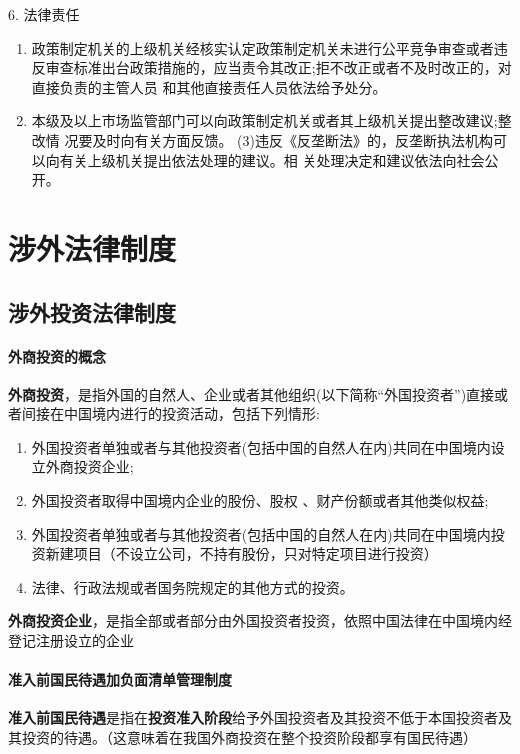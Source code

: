 \documentclass[UTF8,12pt]{ctexart}
\numberwithin{equation}{section} %
\numberwithin{figure}{section}
\numberwithin{table}{section}
\begin{document}
	6. 法律责任
	\begin{enumerate}
		\item 政策制定机关的上级机关经核实认定政策制定机关未进行公平竞争审查或者违反审查标准出台政策措施的，应当责令其改正;拒不改正或者不及时改正的，对直接负责的主管人员 和其他直接责任人员依法给予处分。
		
		\item 本级及以上市场监管部门可以向政策制定机关或者其上级机关提出整改建议;整改情 况要及时向有关方面反馈。 (3)违反《反垄断法》的，反垄断执法机构可以向有关上级机关提出依法处理的建议。相 关处理决定和建议依法向社会公开。
	\end{enumerate}
	
	\newpage
	\section{涉外法律制度}
	
	\subsection{涉外投资法律制度}
	\paragraph{外商投资的概念}
	
	\textbf{外商投资}，是指外国的自然人、企业或者其他组织(以下简称“外国投资者”)直接或者间接在中国境内进行的投资活动，包括下列情形:
	\begin{enumerate}
		\item 外国投资者单独或者与其他投资者(包括中国的自然人在内)共同在中国境内设立外商投资企业;
		
		\item 外国投资者取得中国境内企业的股份、股权 、财产份额或者其他类似权益;
		
		\item 外国投资者单独或者与其他投资者(包括中国的自然人在内)共同在中国境内投资新建项目（不设立公司，不持有股份，只对特定项目进行投资）
		
		\item 法律、行政法规或者国务院规定的其他方式的投资。
	\end{enumerate}

	\textbf{外商投资企业}，是指全部或者部分由外国投资者投资，依照中国法律在中国境内经登记注册设立的企业
	
	\paragraph{准入前国民待遇加负面清单管理制度}
	\textbf{准入前国民待遇}是指在\textbf{投资准入阶段}给予外国投资者及其投资不低于本国投资者及其投资的待遇。（这意味着在我国外商投资在整个投资阶段都享有国民待遇）
	
\end{document}
